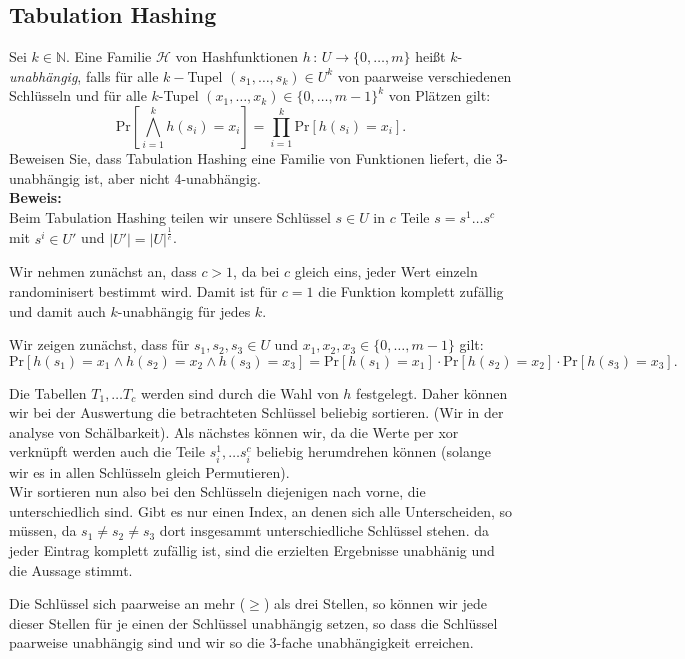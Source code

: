 \documentclass[11pt,a4paper,ngerman]{article}
\newcommand{\prob}[1]{\text{Pr}\left[ #1 \right]}
\begin{document}
\subsection*{Tabulation Hashing}
Sei $k \in \mathbb{N}$. Eine Familie $\mathcal{H}$ von Hashfunktionen $h \, : \, U \rightarrow \{ 0, \ldots, m\}$ heißt $k$-\emph{unabhängig}, falls für alle $k-$Tupel $(s_1,\ldots, s_k) \in U^k$ von paarweise verschiedenen Schlüsseln und für alle $k$-Tupel $(x_1, \ldots, x_k) \in \{0, \ldots, m-1\}^k$ von Plätzen gilt:
$$
	\prob{\bigwedge_{i=1}^k h(s_i) = x_i} = \prod_{i=1}^k \prob{h(s_i) = x_i}.
$$
Beweisen Sie, dass Tabulation Hashing eine Familie von Funktionen liefert, die 3-unabhängig ist, aber nicht 4-unabhängig.\\

\noindent\textbf{Beweis:}\\
Beim Tabulation Hashing teilen wir unsere Schlüssel $s \in U$ in $c$ Teile $s = s^1 \ldots s^c$ mit $s^i \in U'$ und $|U'| = |U|^\frac{1}{c}$.

Wir nehmen zunächst an, dass $c > 1$, da bei $c$ gleich eins, jeder Wert einzeln randominisert bestimmt wird. Damit ist für $c = 1$ die Funktion komplett zufällig und damit auch $k$-unabhängig für jedes $k$.

Wir zeigen zunächst, dass für $s_1,s_2,s_3 \in U$ und $x_1, x_2, x_3 \in \{ 0, \ldots , m-1\}$ gilt:
$$
	\prob{h(s_1) = x_1 \land h(s_2) = x_2 \land h(s_3) = x_3} = \prob{h(s_1)=x_1} \cdot \prob{h(s_2) = x_2} \cdot \prob{h(s_3) = x_3}.
$$

Die Tabellen $T_1, \ldots T_c$ werden sind durch die Wahl von $h$ festgelegt. Daher können wir bei der Auswertung die betrachteten Schlüssel beliebig sortieren. (Wir in der analyse von Schälbarkeit). Als nächstes können wir, da die Werte per xor verknüpft werden auch die Teile $s_i^1, \ldots s_i^c$ beliebig herumdrehen können (solange wir es in allen Schlüsseln gleich Permutieren).\\

Wir sortieren nun also bei den Schlüsseln diejenigen nach vorne, die unterschiedlich sind. Gibt es nur einen Index, an denen sich alle Unterscheiden,
so müssen, da $s_1 \not= s_2 \not= s_3$ dort insgesammt unterschiedliche Schlüssel stehen. da jeder Eintrag komplett zufällig ist, sind die erzielten Ergebnisse unabhänig und die Aussage stimmt.

Die Schlüssel sich paarweise an mehr ($\geq$) als drei Stellen, so können wir jede dieser Stellen für je einen der Schlüssel unabhängig setzen, so dass
die Schlüssel paarweise unabhängig sind und wir so die $3$-fache unabhängigkeit erreichen.
\end{document}
